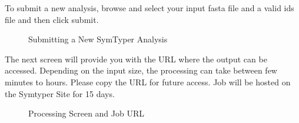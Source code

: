 \documentclass[letterpaper,10pt,english]{sphinxmanual}
\begin{document}
To submit a new analysis, browse and select your input fasta file and a valid  ids file and then click submit.
\begin{figure}[htbp]
\centering
\capstart

\caption{Submitting a New SymTyper Analysis}\end{figure}

The next screen will provide you with the URL where the output can be accessed.
Depending on the input size, the processing can take between few minutes to hours.
Please copy the URL for future access. Job will be hosted on the Symtyper Site for 15 days.
\begin{figure}[htbp]
\centering
\capstart

\caption{Processing Screen and Job URL}\end{figure}
\end{document}
